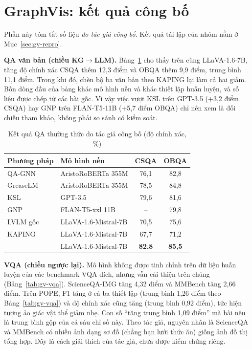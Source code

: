 \section{GraphVis: kết quả công bố}\label{sec:gv-results}
Phần này tóm tắt số liệu \emph{do tác giả công bố}. Kết quả tái lập của nhóm nằm ở Mục~\ref{sec:gv-repro}.

\textbf{QA văn bản (chiều KG$\rightarrow$LLM).} Bảng~\ref{tab:gv-main} cho thấy trên cùng LLaVA-1.6-7B, \GV{} tăng độ chính xác CSQA thêm 12,3 điểm và OBQA thêm 9,9 điểm, trung bình 11,1 điểm. Trong khi đó, chèn bộ ba văn bản theo KAPING lại làm cả hai giảm. Bốn dòng đầu của bảng khác mô hình nền và khác thiết lập huấn luyện, và số liệu được chép từ các bài gốc. Vì vậy việc \GV{} vượt KSL trên GPT-3.5 (+3,2 điểm CSQA) hay GNP trên FLAN-T5-11B (+5,7 điểm OBQA) chỉ nên xem là đối chiếu tham khảo, không phải so sánh có kiểm soát.

\begin{table}[t]
\centering
\caption{Kết quả QA thường thức do tác giả công bố (độ chính xác, \%)}
\label{tab:gv-main}
\small
\begin{tabular}{@{}llcc@{}}
\toprule
Phương pháp & Mô hình nền & CSQA & OBQA \\
\midrule
QA-GNN & AristoRoBERTa 355M & 76,1 & 82,8 \\
GreaseLM & AristoRoBERTa 355M & 78,5 & 84,8 \\
KSL & GPT-3.5 & 79,6 & 81,6 \\
GNP & FLAN-T5-xxl 11B & -- & 79,8 \\
\midrule
LVLM gốc & LLaVA-1.6-Mistral-7B & 70,5 & 75,6 \\
KAPING & LLaVA-1.6-Mistral-7B & 67,7 & 71,2 \\
\GV{} & LLaVA-1.6-Mistral-7B & \textbf{82,8} & \textbf{85,5} \\
\bottomrule
\end{tabular}
\end{table}

\textbf{VQA (chiều ngược lại).} Mô hình không được tinh chỉnh trên dữ liệu huấn luyện của các benchmark VQA đích, nhưng vẫn cải thiện trên chúng (Bảng~\ref{tab:gv-vqa}). ScienceQA-IMG tăng 4,32 điểm và MMBench tăng 2,66 điểm. Trên POPE, F1 tăng ở cả ba thiết lập (trung bình 1,26 điểm theo Bảng~\ref{tab:gv-vqa}) và độ chính xác cũng tăng (trung bình 0,92 điểm), tức hiện tượng ảo giác vật thể giảm nhẹ. Con số ``tăng trung bình 1,09 điểm'' mà bài nêu là trung bình gộp của cả sáu chỉ số này. Theo tác giả, nguyên nhân là ScienceQA và MMBench có nhiều ảnh dạng sơ đồ (chẳng hạn lưới thức ăn) giống ảnh đồ thị tổng hợp. Đây là cách giải thích của tác giả, chưa được kiểm chứng riêng.

